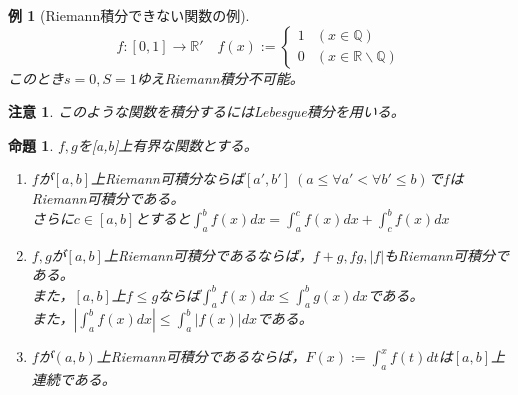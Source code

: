 \documentclass[dvipdfmx,a4j,10pt]{jsarticle}
\theoremstyle{mystyle1}
\newtheorem{prop}[dfn]{命題}
\newtheorem{example}[dfn]{例}
\theoremstyle{mystyle2}
\newtheorem{note}{注意}
\begin{document}
\begin{example}[Riemann積分できない関数の例]
    \[
    f:[0,1]\to\mathbb{R}' \quad
    f(x):=
    \begin{cases}
    1 & (x\in\mathbb{Q})\\
    0 & (x\in\mathbb{R}\backslash\mathbb{Q})
    \end{cases}
    \]
    このとき$s=0,S=1$ゆえRiemann積分不可能。
\end{example}

\begin{note}
    このような関数を積分するにはLebesgue積分を用いる。
\end{note}
\begin{framed}
    \begin{prop}\label{prop10.4}
        $f,g$を[a,b]上有界な関数とする。
        \begin{enumerate}
        	\item
        	$f$が$[a,b]$上Riemann可積分ならば$[a',b']\ (a\leq \forall a'<\forall b'\leq b)$で$f$はRiemann可積分である。\\さらに$c\in [a,b]$とすると$\displaystyle\int_a^b f(x)dx=\int_a^c f(x)dx+\int_c^b f(x)dx$
        	\item
        	$f,g$が$[a,b]$上Riemann可積分であるならば，$f+g,fg,|f|$もRiemann可積分である。\\
        	また，$[a,b]$上$f\leq g$ならば$\displaystyle\int_a^b f(x) dx\leq\int_a^b g(x)dx$である。\\また，$\displaystyle \left|\int_a^b f(x)dx\right|\leq\int_a^b|f(x)|dx$\footnotemark である。
        	\item
        	$f$が$(a,b)$上Riemann可積分であるならば，$\displaystyle F(x):=\int_a^x f(t)dt$は$[a,b]$上連続である。
        \end{enumerate}
    \end{prop}
\end{framed}
\end{document}
